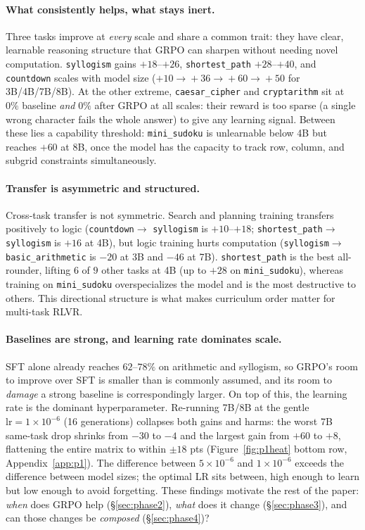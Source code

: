 \documentclass{article}
\begin{document}
\paragraph{What consistently helps, what stays inert.} Three tasks improve at \emph{every} scale
and share a common trait: they have clear, learnable reasoning structure that GRPO can sharpen
without needing novel computation. \texttt{syllogism} gains $+18$--$+26$, \texttt{shortest\_path}
$+28$--$+40$, and \texttt{countdown} scales with model size
($+10\!\rightarrow\!+36\!\rightarrow\!+60\!\rightarrow\!+50$ for 3B/4B/7B/8B). At the other extreme,
\texttt{caesar\_cipher} and \texttt{cryptarithm} sit at $0\%$ baseline \emph{and} $0\%$ after GRPO
at all scales: their reward is too sparse (a single wrong character fails the whole answer) to give
any learning signal. Between these lies a capability threshold: \texttt{mini\_sudoku} is unlearnable
below 4B but reaches $+60$ at 8B, once the model has the capacity to track row, column, and subgrid
constraints simultaneously.

\paragraph{Transfer is asymmetric and structured.} Cross-task transfer is not symmetric.
Search and planning training transfers positively to logic (\texttt{countdown}$\rightarrow$
\texttt{syllogism} is $+10$--$+18$; \texttt{shortest\_path}$\rightarrow$\texttt{syllogism} is $+16$
at 4B), but logic training hurts computation (\texttt{syllogism}$\rightarrow$
\texttt{basic\_arithmetic} is $-20$ at 3B and $-46$ at 7B). \texttt{shortest\_path} is the best
all-rounder, lifting $6$ of $9$ other tasks at 4B (up to $+28$ on \texttt{mini\_sudoku}), whereas
training on \texttt{mini\_sudoku} overspecializes the model and is the most destructive to others.
This directional structure is what makes curriculum order matter for multi-task RLVR.

\paragraph{Baselines are strong, and learning rate dominates scale.} SFT alone already reaches
$62$--$78\%$ on arithmetic and syllogism, so GRPO's room to improve over SFT is smaller than is
commonly assumed, and its room to \emph{damage} a strong baseline is correspondingly larger.
On top of this, the learning rate is the dominant hyperparameter. Re-running 7B/8B at the gentle
$\mathrm{lr}{=}1\!\times\!10^{-6}$ (16 generations) collapses both gains and harms: the worst 7B
same-task drop shrinks from $-30$ to $-4$ and the largest gain from $+60$ to $+8$, flattening the
entire matrix to within $\pm18$ pts (Figure~\ref{fig:p1heat} bottom row, Appendix~\ref{app:p1}). The
difference between $5\!\times\!10^{-6}$ and $1\!\times\!10^{-6}$ exceeds the difference between model
sizes; the optimal LR sits between, high enough to learn but low enough to avoid forgetting. These
findings motivate the rest of the paper: \emph{when} does GRPO help (\S\ref{sec:phase2}),
\emph{what} does it change (\S\ref{sec:phase3}), and can those changes be \emph{composed}
(\S\ref{sec:phase4})?
\end{document}
